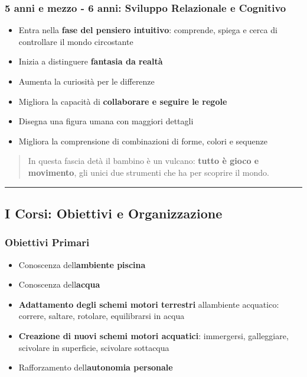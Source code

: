 \documentclass[a4paper,11pt]{article}
\providecommand{\tightlist}{%
  \setlength{\itemsep}{0pt}\setlength{\parskip}{0pt}}
\begin{document}
\subsubsection{5 anni e mezzo - 6 anni: Sviluppo Relazionale e
      Cognitivo}\label{anni-e-mezzo---6-anni-sviluppo-relazionale-e-cognitivo}

\begin{itemize}
      \tightlist
      \item
            Entra nella \textbf{fase del pensiero intuitivo}: comprende, spiega e
            cerca di controllare il mondo circostante
      \item
            Inizia a distinguere \textbf{fantasia da realtà}
      \item
            Aumenta la curiosità per le differenze
      \item
            Migliora la capacità di \textbf{collaborare e seguire le regole}
      \item
            Disegna una figura umana con maggiori dettagli
      \item
            Migliora la comprensione di combinazioni di forme, colori e sequenze
\end{itemize}

\begin{quote}
      In questa fascia d\textquotesingle età il bambino è un vulcano:
      \textbf{tutto è gioco e movimento}, gli unici due strumenti che ha per
      scoprire il mondo.
\end{quote}

\begin{center}\rule{0.5\linewidth}{0.5pt}\end{center}

\subsection{I Corsi: Obiettivi e
      Organizzazione}\label{i-corsi-obiettivi-e-organizzazione}

\subsubsection{Obiettivi Primari}\label{obiettivi-primari}

\begin{itemize}
      \tightlist
      \item
            Conoscenza dell\textquotesingle{}\textbf{ambiente piscina}
      \item
            Conoscenza dell\textquotesingle{}\textbf{acqua}
      \item
            \textbf{Adattamento degli schemi motori terrestri}
            all\textquotesingle ambiente acquatico: correre, saltare, rotolare,
            equilibrarsi in acqua
      \item
            \textbf{Creazione di nuovi schemi motori acquatici}: immergersi,
            galleggiare, scivolare in superficie, scivolare
            sott\textquotesingle acqua
      \item
            Rafforzamento dell\textquotesingle{}\textbf{autonomia personale}
\end{itemize}
\end{document}
